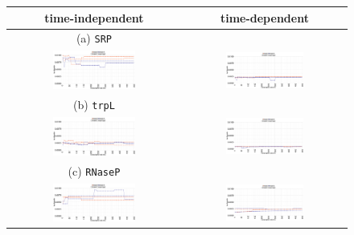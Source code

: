 \documentclass[ twoside,openright,titlepage,numbers=noenddot,headinclude,%
                footinclude=false, cleardoublepage=empty,abstractoff, %
                BCOR=5mm,paper=a4,fontsize=11pt,%
                ngerman,american,%
                ]{scrreprt}
\begin{document}
\begin{figure}[ht]
\centering
\begin{tabular}{c|c}
time-independent & time-dependent\\
\hline
(a) \texttt{SRP} \\
\includegraphics[width=0.5\textwidth]{./pictures/basePairDiversity/WithoutTime/SRP-WithoutTime.pdf} &
\includegraphics[width=0.5\textwidth]{./pictures/basePairDiversity/TimeDepended/SRPWithTime.pdf}\\
\hline
(b) \texttt{trpL} \\
\includegraphics[width=0.5\textwidth]{./pictures/basePairDiversity/WithoutTime/TRP-WithoutTime.pdf}&
\includegraphics[width=0.5\textwidth]{./pictures/basePairDiversity/TimeDepended/TRPWithTime.pdf}\\
\hline
(c) \texttt{RNaseP} \\
\includegraphics[width=0.5\textwidth]{./pictures/basePairDiversity/WithoutTime/RNAseP-WithoutTime.pdf}&
\includegraphics[width=0.5\textwidth]{./pictures/basePairDiversity/TimeDepended/RNAsePWithTime.pdf}\\


\end{tabular}
\end{figure}
\end{document}
